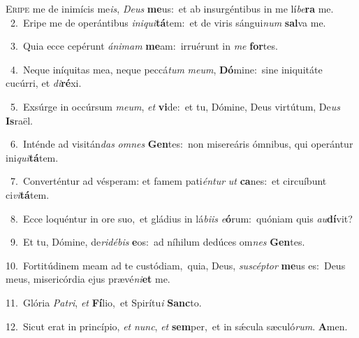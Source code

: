 \lettrine{\initial\textcolor{\initialcolor}{E}}{ripe} me de inimícis me\-\textit{is}\-, \textit{De}\-\textit{us} \textbf{me}\-us:~\star et ab insurgéntibus in me lí\-\textit{be}\-\textbf{ra} me.\\
{\numbfont\textcolor{\numbcolor}{~2.}}~Eripe me de operántibus \textit{in}\-\textit{i}\textit{qui}\textbf{tá}tem:~\star et de viris sángui\textit{num} \textbf{sal}\-va me.\par
{\numbfont\textcolor{\numbcolor}{~3.}}~Quia ecce cepérunt \textit{á}\-\textit{ni}\textit{mam} \textbf{me}\-am:~\star irruérunt in \textit{me} \textbf{for}\-tes.\par
{\numbfont\textcolor{\numbcolor}{~4.}}~Neque iníquitas mea, neque peccá\textit{tum} \textit{me}\-\textit{um}, \textbf{Dó}\-mine:~\star sine iniquitáte cucúrri, et \textit{di}\-\textbf{ré}xi.\par
{\numbfont\textcolor{\numbcolor}{~5.}}~Exsúrge in occúrsum \textit{me}\-\textit{um}, \textit{et} \textbf{vi}\-de:~\star et tu, Dómine, Deus virtútum, De\textit{us} \textbf{Is}\-raël.\par
{\numbfont\textcolor{\numbcolor}{~6.}}~Inténde ad visitán\textit{das} \textit{om}\-\textit{nes} \textbf{Gen}\-tes:~\star non misereáris ómnibus, qui operántur ini\-\textit{qui}\-\textbf{tá}tem.\par
{\numbfont\textcolor{\numbcolor}{~7.}}~Converténtur ad vésperam: et famem pati\-\textit{én}\-\textit{tur} \textit{ut} \textbf{ca}\-nes:~\star et circuíbunt ci\-\textit{vi}\-\textbf{tá}tem.\par
{\numbfont\textcolor{\numbcolor}{~8.}}~Ecce loquéntur in ore suo,~\dagger et gládius in lá\-\textit{bi}\-\textit{is} \textit{e}\-\textbf{ó}rum:~\star quóniam quis \textit{au}\-\textbf{dí}vit?\par
{\numbfont\textcolor{\numbcolor}{~9.}}~Et tu, Dómine, de\-\textit{ri}\-\textit{dé}\textit{bis} \textbf{e}\-os:~\star ad níhilum dedúces om\textit{nes} \textbf{Gen}\-tes.\par
{\numbfont\textcolor{\numbcolor}{10.}}~Fortitúdinem meam ad te custódiam,~\dagger quia, Deus, \textit{su}\-\textit{scép}\textit{tor} \textbf{me}\-us es:~\star Deus meus, misericórdia ejus prævé\-\textit{ni}\-\textbf{et} me.\par
{\numbfont\textcolor{\numbcolor}{11.}}~Glória \textit{Pa}\-\textit{tri}, \textit{et} \textbf{Fí}\-lio,~\star et Spirítu\textit{i} \textbf{Sanc}\-to.\par
{\numbfont\textcolor{\numbcolor}{12.}}~Sicut erat in princípio, \textit{et} \textit{nunc}\-, \textit{et} \textbf{sem}\-per,~\star et in sǽcula sæculó\-\textit{rum}\-. \textbf{A}\-men.\par
